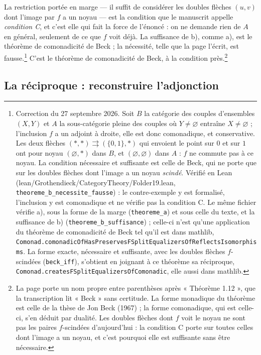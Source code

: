 \documentclass[11pt,a4paper]{article}
\begin{document}
La restriction portée en marge — il suffit de considérer les doubles flèches
$(u,v)$ dont l'image par $f$ a un noyau — est la condition que le manuscrit
appelle \emph{condition C}, et c'est elle qui fait la force de l'énoncé : on ne
demande rien de $A$ en général, seulement de ce que $f$ voit déjà. La
suffisance de b), comme a), est le théorème de comonadicité de Beck ; la
nécessité, telle que la page l'écrit, est fausse.\footnote{Correction du 27
septembre 2026. Soit $B$ la catégorie des couples d'ensembles $(X, Y)$ et $A$ la
sous-catégorie pleine des couples où $Y \neq \varnothing$ entraîne
$X \neq \varnothing$ ; l'inclusion $f$ a un adjoint à droite, elle est donc
comonadique, et conservative. Les deux flèches $(\ast, \ast) \rightrightarrows
(\{0, 1\}, \ast)$ qui envoient le point sur $0$ et sur $1$ ont pour noyau
$(\varnothing, \ast)$ dans $B$, et $(\varnothing, \varnothing)$ dans $A$ : $f$ ne
commute pas à ce noyau. La condition nécessaire et suffisante est celle de Beck,
qui ne porte que sur les doubles flèches dont l'image a un noyau \emph{scindé}.
Vérifié en Lean (lean/Grothendieck/CategoryTheory/Folder19.lean, \texttt{theoreme\_b\_necessite\_fausse}) : le contre-exemple y est formalisé, l'inclusion y est comonadique et ne vérifie pas la condition C. Le même fichier vérifie a), sous la forme de la marge (\texttt{theoreme\_a}) et sous celle du texte, et la suffisance de b) (\texttt{theoreme\_b\_suffisance}) ; celle-ci n'est qu'une application du théorème de comonadicité de Beck tel qu'il est dans mathlib, \texttt{Comonad.comonadicOfHasPreservesFSplitEqualizersOfReflectsIsomorphisms}. La forme exacte, nécessaire et suffisante, avec les doubles flèches $f$-scindées (\texttt{beck\_iff}), s'obtient en joignant à ce théorème sa réciproque, \texttt{Comonad.createsFSplitEqualizersOfComonadic}, elle aussi dans mathlib.} C'est le
théorème de comonadicité de Beck, à la condition près.\footnote{La page porte
un nom propre entre parenthèses après « Théorème 1.12 », que la transcription
lit « Beck » sans certitude. La forme monadique du théorème est celle de la
thèse de Jon Beck (1967) ; la forme comonadique, qui est celle-ci, s'en déduit
par dualité. Les doubles flèches dont $f$ voit le noyau ne sont pas les paires
$f$-scindées d'aujourd'hui : la condition C porte sur toutes celles dont l'image
a un noyau, et c'est pourquoi elle est suffisante sans être nécessaire.}

\subsection*{La réciproque : reconstruire l'adjonction}
\end{document}
